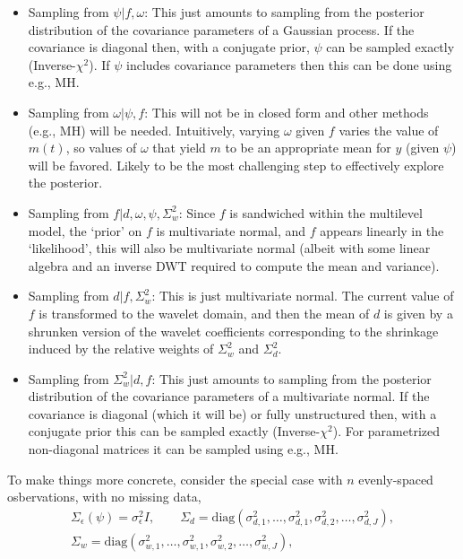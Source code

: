 \documentclass[a4paper,11pt]{article}
\begin{document}
\begin{itemize}
\item Sampling from $\psi|f,\omega$: This just amounts to sampling from the posterior distribution of the covariance parameters of a Gaussian process. If the covariance is diagonal then, with a conjugate prior, $\psi$ can be sampled exactly (Inverse-$\chi^{2}$). If $\psi$ includes covariance parameters then this can be done using e.g., MH. 
\item Sampling from $\omega|\psi,f$: This will not be in closed form and other methods (e.g., MH) will be needed. Intuitively, varying $\omega$ given $f$ varies the value of $m(t)$, so values of $\omega$ that yield $m$ to be an appropriate mean for $y$ (given $\psi$) will be favored. Likely to be the most challenging step to effectively explore the posterior.
\item Sampling from $f|d,\omega,\psi,\Sigma^{2}_{w}$: Since $f$ is sandwiched within the multilevel model, the \lq{}prior\rq{} on $f$ is multivariate normal, and $f$ appears linearly in the \lq{}likelihood\rq{}, this will also be multivariate normal (albeit with some linear algebra and an inverse DWT required to compute the mean and variance). 
\item Sampling from $d|f,\Sigma^{2}_{w}$: This is just multivariate normal. The current value of $f$ is transformed to the wavelet domain, and then the mean of $d$ is given by a shrunken version of the wavelet coefficients corresponding to the shrinkage induced by the relative weights of $\Sigma^{2}_{w}$ and $\Sigma^{2}_{d}$. 
\item Sampling from $\Sigma^{2}_{w}|d,f$: This just amounts to sampling from the posterior distribution of the covariance parameters of a multivariate normal. If the covariance is diagonal (which it will be) or fully unstructured then, with a conjugate prior this can be sampled exactly (Inverse-$\chi^{2}$). For parametrized non-diagonal matrices it can be sampled using e.g., MH.
\end{itemize}
To make things more concrete, consider the special case with $n$ evenly-spaced osbervations, with no missing data, 
\begin{gather*}
 \Sigma_{\epsilon}(\psi) = \sigma^{2}_{\epsilon}I , \qquad \Sigma_{d} = \textrm{diag}\left(\sigma^{2}_{d,1},\ldots,\sigma^{2}_{d,1},\sigma^{2}_{d,2},\ldots,\sigma^{2}_{d,J}\right) , \\
 \Sigma_{w} = \textrm{diag}\left(\sigma^{2}_{w,1},\ldots,\sigma^{2}_{w,1},\sigma^{2}_{w,2},\ldots,\sigma^{2}_{w,J}\right) ,
\end{gather*}
\end{document}
